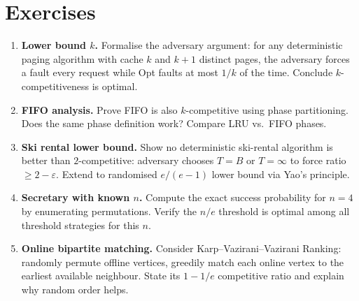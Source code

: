 \section{Exercises}
\label{sec:ch03-exercises}
\begin{enumerate}[label=E3.\arabic*, leftmargin=*, itemsep=0.7em]
    \item \textbf{Lower bound $k$.} Formalise the adversary argument: for any deterministic paging algorithm with cache $k$ and $k+1$ distinct pages, the adversary forces a fault every request while Opt faults at most $1/k$ of the time. Conclude $k$-competitiveness is optimal.
    \item \textbf{FIFO analysis.} Prove FIFO is also $k$-competitive using phase partitioning. Does the same phase definition work? Compare LRU vs.\ FIFO phases.
    \item \textbf{Ski rental lower bound.} Show no deterministic ski-rental algorithm is better than $2$-competitive: adversary chooses $T=B$ or $T=\infty$ to force ratio $\ge2-\varepsilon$. Extend to randomised $e/(e-1)$ lower bound via Yao's principle.
    \item \textbf{Secretary with known $n$.} Compute the exact success probability for $n=4$ by enumerating permutations. Verify the $n/e$ threshold is optimal among all threshold strategies for this $n$.
    \item \textbf{Online bipartite matching.} Consider Karp--Vazirani--Vazirani Ranking: randomly permute offline vertices, greedily match each online vertex to the earliest available neighbour. State its $1-1/e$ competitive ratio and explain why random order helps.
\end{enumerate}
